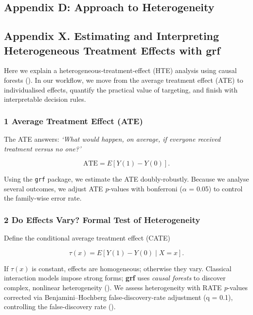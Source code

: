 \documentclass[
  single column]{article}
\begin{document}
\newpage{}

\subsection{Appendix D: Approach to
Heterogeneity}\label{appendix-cate-validation}

\subsection{\texorpdfstring{Appendix X. Estimating and Interpreting
Heterogeneous Treatment Effects with
\textbf{grf}}{Appendix X. Estimating and Interpreting Heterogeneous Treatment Effects with grf}}\label{appendix-x.-estimating-and-interpreting-heterogeneous-treatment-effects-with-grf}

Here we explain a heterogeneous‐treatment‐effect (HTE) analysis using
causal forests (). In our
workflow, we move from the average treatment effect (ATE) to
individualised effects, quantify the practical value of targeting, and
finish with interpretable decision rules.

\subsubsection{1 Average Treatment Effect
(ATE)}\label{average-treatment-effect-ate}

The ATE answers: \emph{`What would happen, on average, if everyone
received treatment versus no one?'}

\[
    \text{ATE}=E[Y(1)-Y(0)].
\]

Using the \texttt{grf} package, we estimate the ATE doubly-robustly.
Because we analyse several outcomes, we adjust ATE \emph{p}-values with
bonferroni (\(\alpha\) = 0.05) to control the family-wise error rate.

\subsubsection{2 Do Effects Vary? Formal Test of
Heterogeneity}\label{do-effects-vary-formal-test-of-heterogeneity}

Define the conditional average treatment effect (CATE)

\[
  \tau(x)=E[Y(1)-Y(0)\mid X=x].
\]

If \(\tau(x)\) is constant, effects are homogeneous; otherwise they
vary. Classical interaction models impose strong forms; \textbf{grf}
uses \emph{causal forests} to discover complex, nonlinear heterogeneity
(). We assess
heterogeneity with RATE \emph{p}-values corrected via
Benjamini--Hochberg false-discovery-rate adjustment (q = 0.1),
controlling the false-discovery rate
().
\end{document}
